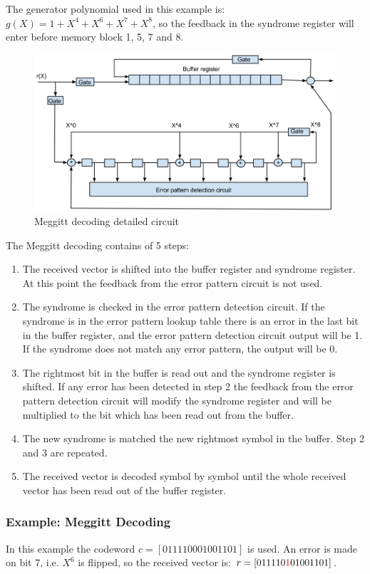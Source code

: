 \documentclass[Main]{subfiles}
\begin{document}
The generator polynomial used in this example is: $g(X)=1+X^4+X^6+X^7+X^8$, so the feedback in the syndrome register will enter before memory block 1, 5, 7 and 8. 


\begin{figure}[htbp]
\centering
\includegraphics[width=0.7\linewidth]{./Picture/MeggittCircuit}
\caption[Meggit Decoder example]{Meggitt decoding detailed circuit}
\label{fig:Meggitt_decoder_example}
\end{figure}

The Meggitt decoding contains of 5 steps:
\begin{enumerate}
\item The received vector is shifted into the buffer register and syndrome register.
At this point the feedback from the error pattern circuit is not used.
\item The syndrome is checked in the error pattern detection circuit.
If the syndrome is in the error pattern lookup table there is an error in the last bit in the buffer register, and the error pattern detection circuit output will be 1.
If the syndrome does not match any error pattern, the output will be 0.
\item The rightmost bit in the buffer is read out and the syndrome register is shifted. If any error has been detected in step 2 the feedback from the error pattern detection circuit will modify the syndrome register and will be multiplied to the bit which has been read out from the buffer. 
\item The new syndrome is matched the new rightmost symbol in the buffer. Step 2 and 3 are repeated.
\item The received vector is decoded symbol by symbol until the whole received vector has been read out of the buffer register.
\end{enumerate}

\subsubsection{Example: Meggitt Decoding}
\label{sec:MeggittDedocerMaterial}
In this example the codeword $ c = [0 1 1 1 1 0 0 0 1 0 0 1 1 0 1] $ is used.
An error is made on bit 7, i.e. $X^6$ is flipped, so the received vector is: $ r = [0 1 1 1 1 0 {\color{red}1} 0 1 0 0 1 1 0 1] $.
\end{document}
